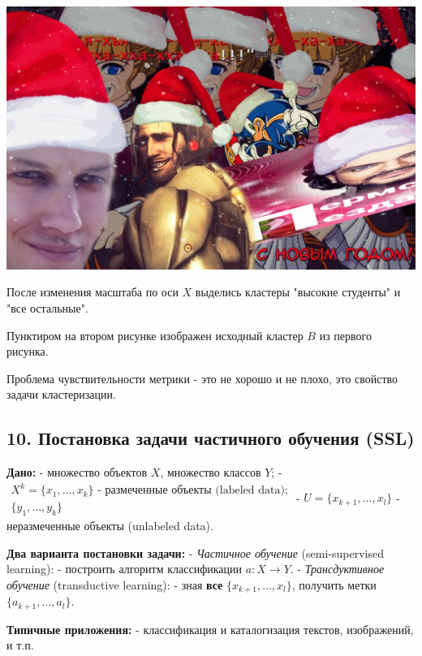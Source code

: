 \includegraphics[scale=0.3]{figures/samplefigure.jpg}

После изменения масштаба по оси $X$ выделись кластеры "высокие студенты"
и "все остальные".

Пунктиром на втором рисунке изображен исходный кластер $B$ из первого
рисунка.

Проблема чувствительности метрики - это не хорошо и не плохо, это свойство
задачи кластеризации.

\subsection{10. Постановка задачи частичного обучения (SSL)}

\textbf{Дано:}
- множество объектов $X$, множество классов $Y$;
- $\begin{matrix}X^k = {\lbrace x_1, \ldots, x_k \rbrace} \text{ - размеченные объекты (labeled data);}\\{\lbrace y_1, \ldots, y_k \rbrace} \qquad \qquad \qquad \qquad \qquad \qquad \qquad \,\end{matrix}$
- $U = {\lbrace x_{k+1}, \ldots, x_l \rbrace}$ - неразмеченные объекты
(unlabeled data).

\textbf{Два варианта постановки задачи:}
- \textit{Частичное обучение} (semi-supervised learning): 
    - построить алгоритм классификации $a \! : X \rightarrow Y$.
- \textit{Трансдуктивное обучение} (transductive learning):
    - зная \textbf{все} ${\lbrace x_{k+1}, \ldots, x_l \rbrace}$, получить
    метки ${\lbrace a_{k+1}, \ldots, a_l \rbrace}$.

\textbf{Типичные приложения:}
- классификация и каталогизация текстов, изображений, и т.п.

